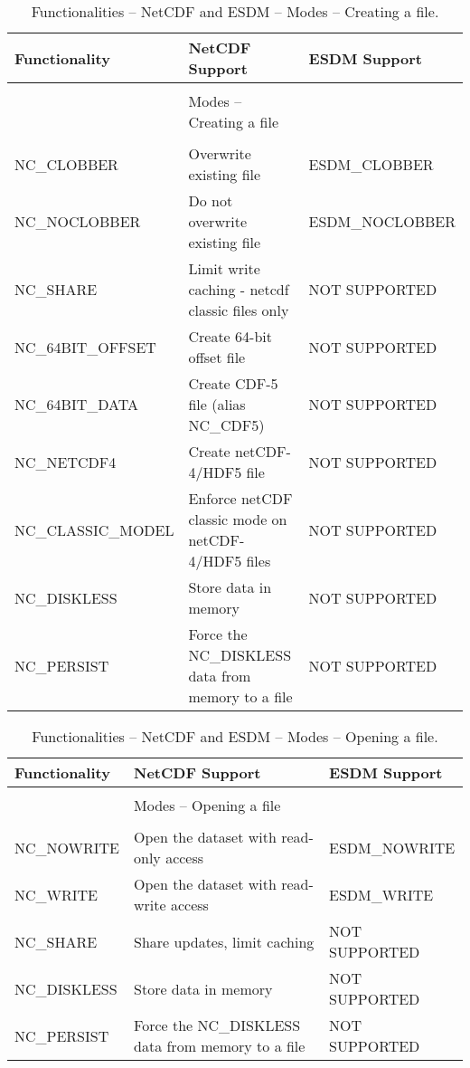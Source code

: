 \begin{table}[H]
\centering
\begin{tabular}{|l|m{6cm}|l|}
\hline
Functionality & NetCDF Support & ESDM Support \\ \hline \hline
& & \\
& \large{Modes -- Creating a file} & \\
& & \\ \hline \hline

NC\_CLOBBER & Overwrite existing file &  ESDM\_CLOBBER       \\ \hline
NC\_NOCLOBBER & Do not overwrite existing file &  ESDM\_NOCLOBBER       \\ \hline
NC\_SHARE & Limit write caching - netcdf classic files only &  NOT SUPPORTED       \\ \hline
NC\_64BIT\_OFFSET & Create 64-bit offset file &    NOT SUPPORTED     \\ \hline
NC\_64BIT\_DATA  & Create CDF-5 file (alias NC\_CDF5) &   NOT SUPPORTED      \\ \hline
NC\_NETCDF4 & Create netCDF-4/HDF5 file &  NOT SUPPORTED       \\ \hline
NC\_CLASSIC\_MODEL & Enforce netCDF classic mode on netCDF-4/HDF5 files &   NOT SUPPORTED      \\ \hline
NC\_DISKLESS & Store data in memory &    NOT SUPPORTED     \\ \hline
NC\_PERSIST & Force the NC\_DISKLESS data from memory to a file &  NOT SUPPORTED       \\ \hline
\hline
\end{tabular}
\caption{Functionalities -- NetCDF and ESDM -- Modes -- Creating a file.}
\end{table}

\begin{table}[H]
\centering
\begin{tabular}{|l|m{8cm}|l|}
\hline
Functionality & NetCDF Support & ESDM Support \\ \hline \hline
& & \\
& \large{Modes -- Opening a file} & \\
& & \\ \hline \hline

NC\_NOWRITE & Open the dataset with read-only access &  ESDM\_NOWRITE       \\ \hline
NC\_WRITE & Open the dataset with read-write access &  ESDM\_WRITE       \\ \hline
NC\_SHARE & Share updates, limit caching &  NOT SUPPORTED       \\ \hline
NC\_DISKLESS & Store data in memory &    NOT SUPPORTED     \\ \hline
NC\_PERSIST & Force the NC\_DISKLESS data from memory to a file &  NOT SUPPORTED       \\ \hline
\hline
\end{tabular}
\caption{Functionalities -- NetCDF and ESDM -- Modes -- Opening a file.}
\end{table}

